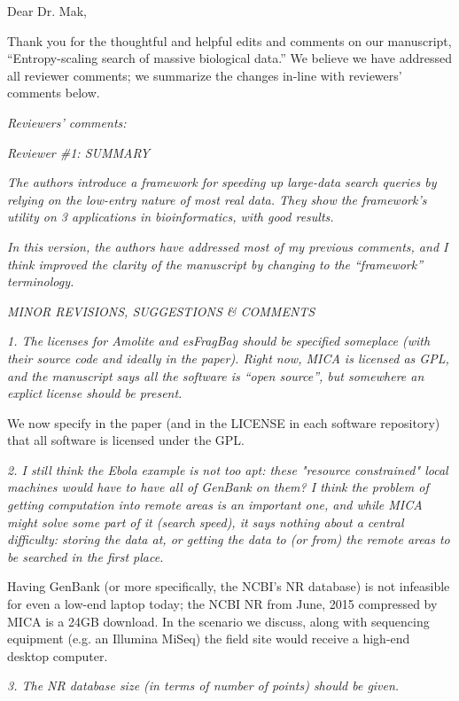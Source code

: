 \documentclass[12pt]{letter}
\begin{document}
\begin{letter}{}
\opening{Dear Dr. Mak,}

\medskip

Thank you for the thoughtful and helpful edits and comments on our manuscript, ``Entropy-scaling search of massive biological data.''
We believe we have addressed all reviewer comments; we summarize the changes in-line with reviewers' comments below.

\emph{Reviewers' comments:}

\emph{Reviewer \#1: SUMMARY}

\emph{The authors introduce a framework for speeding up large-data search queries by
relying on the low-entry nature of most real data. They show the framework's
utility on 3 applications in bioinformatics, with good results.}

\emph{In this version, the authors have addressed most of my previous comments, and I
think improved the clarity of the manuscript by changing to the ``framework''
terminology. }


\emph{MINOR REVISIONS, SUGGESTIONS \& COMMENTS}

\emph{1. The licenses for Amolite and esFragBag should be specified someplace (with
their source code and ideally in the paper). Right now, MICA is licensed as
GPL, and the manuscript says all the software is ``open source'', but somewhere
an explict license should be present.}

We now specify in the paper (and in the LICENSE in each software repository) that all software is licensed under the GPL.

\emph{2. I still think the Ebola example is not too apt: these "resource constrained"
local machines would have to have all of GenBank on them? I think the problem
of getting computation into remote areas is an important one, and while MICA
might solve some part of it (search speed), it says nothing about a central difficulty: 
storing the data at, or getting the data to (or from) the remote areas to be searched in the first place. }

Having GenBank (or more specifically, the NCBI's NR database) is not infeasible
for even a low-end laptop today; the NCBI NR from June, 2015 compressed by MICA 
is a 24GB download. In the scenario we discuss, along with 
sequencing equipment (e.g. an Illumina MiSeq) the field site would receive a 
high-end desktop computer.


\emph{3. The NR database size (in terms of number of points) should be given.}


\end{letter}
\end{document}
